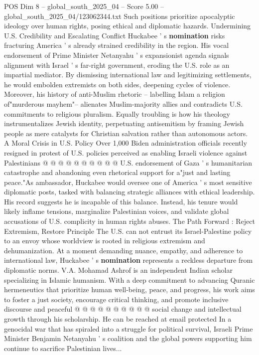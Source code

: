 \begin{textsample}{POS Dim 8 – global\_south\_2025\_04 – Score 5.00 – global\_south\_2025\_04/123062344.txt}
Such positions prioritize apocalyptic ideology over human rights, posing ethical and diplomatic hazards.
Undermining U.S.
Credibility and Escalating Conflict Huckabee ' s \textbf{nomination} risks fracturing America ' s already strained credibility in the region.
His vocal endorsement of Prime Minister Netanyahu ' s expansionist agenda signals alignment with Israel ' s far-right government, eroding the U.S. role as an impartial mediator.
By dismissing international law and legitimizing settlements, he would embolden extremists on both sides, deepening cycles of violence.
Moreover, his history of anti-Muslim rhetoric -- labelling Islam a religion of"murderous mayhem"-- alienates Muslim-majority allies and contradicts U.S. commitments to religious pluralism.
Equally troubling is how his theology instrumentalizes Jewish identity, perpetuating antisemitism by framing Jewish people as mere catalysts for Christian salvation rather than autonomous actors.
A Moral Crisis in U.S.
Policy Over 1,000 Biden administration officials recently resigned in protest of U.S. policies perceived as enabling Israeli violence against Palestinians @ @ @ @ @ @ @ @ @ @ U.S. endorsement of Gaza ' s humanitarian catastrophe and abandoning even rhetorical support for a"just and lasting peace."As ambassador, Huckabee would oversee one of America ' s most sensitive diplomatic posts, tasked with balancing strategic alliances with ethical leadership.
His record suggests he is incapable of this balance.
Instead, his tenure would likely inflame tensions, marginalize Palestinian voices, and validate global accusations of U.S. complicity in human rights abuses.
The Path Forward : Reject Extremism, Restore Principle The U.S. can not entrust its Israel-Palestine policy to an envoy whose worldview is rooted in religious extremism and dehumanization.
At a moment demanding nuance, empathy, and adherence to international law, Huckabee ' s \textbf{nomination} represents a reckless departure from diplomatic norms.
V.A.
Mohamad Ashrof is an independent Indian scholar specializing in Islamic humanism.
With a deep commitment to advancing Quranic hermeneutics that prioritize human well-being, peace, and progress, his work aims to foster a just society, encourage critical thinking, and promote inclusive discourse and peaceful @ @ @ @ @ @ @ @ @ @ social change and intellectual growth through his scholarship.
He can be reached at email protected In a genocidal war that has spiraled into a struggle for political survival, Israeli Prime Minister Benjamin Netanyahu ' s coalition and the global powers supporting him continue to sacrifice Palestinian lives...

\end{textsample}
